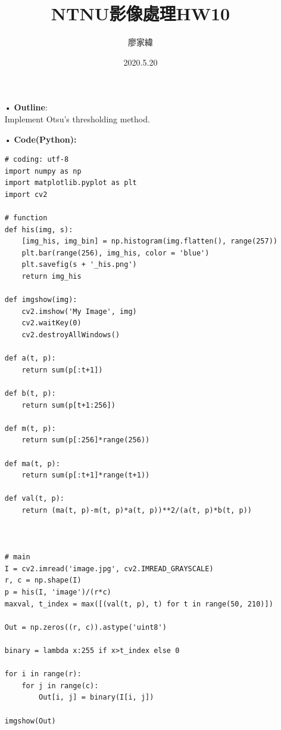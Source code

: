 \documentclass[12pt,a4paper]{article}
\title{NTNU影像處理HW10}
\author{廖家緯}
\date{2020.5.20}
\begin{document}
\maketitle
\fontsize{12pt}{20pt}\selectfont
\setlength{\baselineskip}{20pt}

\pagestyle{fancy}
\lhead{}
\chead{}
\rhead{}
\lfoot{}
\cfoot{\thepage}
\rfoot{}
\renewcommand{\headrulewidth}{0pt} %
\renewcommand{\footrulewidth}{0pt} %




\begin{enumerate}
\item[•]{\bf Outline}:\\
Implement Otsu's thresholding method.

\item[•]
{\bf Code(Python):}
\begin{lstlisting}
# coding: utf-8
import numpy as np
import matplotlib.pyplot as plt
import cv2

# function
def his(img, s):
    [img_his, img_bin] = np.histogram(img.flatten(), range(257))
    plt.bar(range(256), img_his, color = 'blue')
    plt.savefig(s + '_his.png')
    return img_his

def imgshow(img):
    cv2.imshow('My Image', img)
    cv2.waitKey(0)
    cv2.destroyAllWindows()
    
def a(t, p):
    return sum(p[:t+1])

def b(t, p):
    return sum(p[t+1:256])

def m(t, p):
    return sum(p[:256]*range(256))

def ma(t, p):
    return sum(p[:t+1]*range(t+1))

def val(t, p):
    return (ma(t, p)-m(t, p)*a(t, p))**2/(a(t, p)*b(t, p))



# main
I = cv2.imread('image.jpg', cv2.IMREAD_GRAYSCALE)
r, c = np.shape(I)
p = his(I, 'image')/(r*c)
maxval, t_index = max([(val(t, p), t) for t in range(50, 210)])

Out = np.zeros((r, c)).astype('uint8')

binary = lambda x:255 if x>t_index else 0

for i in range(r):
    for j in range(c):
        Out[i, j] = binary(I[i, j])
        
imgshow(Out)
\end{lstlisting}


\end{enumerate}
\end{document}
